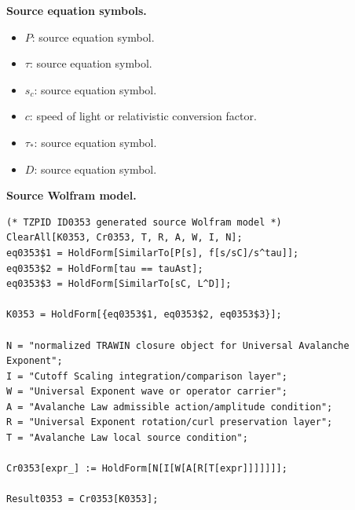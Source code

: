\begin{minipage}[t]{0.49\linewidth}
\begingroup
\small
\raggedright
\textbf{Source equation symbols.}\par
\begin{itemize}[leftmargin=1.35em,itemsep=1pt,topsep=1pt,parsep=0pt]
    \item $P$: source equation symbol.
    \item $\tau$: source equation symbol.
    \item $s_{c}$: source equation symbol.
    \item $c$: speed of light or relativistic conversion factor.
    \item $\tau_{\ast}$: source equation symbol.
    \item $D$: source equation symbol.
\end{itemize}
\endgroup
\end{minipage}\hfill
\begin{minipage}[t]{0.47\linewidth}
\begingroup
\scriptsize
\raggedright
\textbf{Source Wolfram model.}\par
\begin{Verbatim}[fontsize=\tiny,breaklines=true,breakanywhere=true]
(* TZPID ID0353 generated source Wolfram model *)
ClearAll[K0353, Cr0353, T, R, A, W, I, N];
eq0353$1 = HoldForm[SimilarTo[P[s], f[s/sC]/s^tau]];
eq0353$2 = HoldForm[tau == tauAst];
eq0353$3 = HoldForm[SimilarTo[sC, L^D]];

K0353 = HoldForm[{eq0353$1, eq0353$2, eq0353$3}];

N = "normalized TRAWIN closure object for Universal Avalanche Exponent";
I = "Cutoff Scaling integration/comparison layer";
W = "Universal Exponent wave or operator carrier";
A = "Avalanche Law admissible action/amplitude condition";
R = "Universal Exponent rotation/curl preservation layer";
T = "Avalanche Law local source condition";

Cr0353[expr_] := HoldForm[N[I[W[A[R[T[expr]]]]]]];

Result0353 = Cr0353[K0353];
\end{Verbatim}
\endgroup
\end{minipage}

